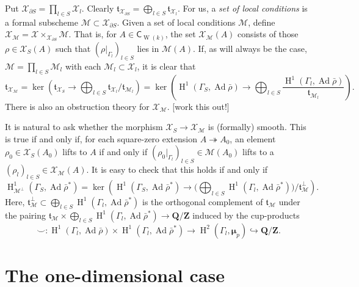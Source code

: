\documentclass{article}
\DeclareMathOperator{\adjoint}{Ad}
\DeclareMathOperator{\h}{H}
\DeclareMathOperator{\witt}{W}
\newcommand{\cM}{\mathcal{M}}
\newcommand{\cX}{\mathcal{X}}
\newcommand{\dmu}{\bm\mu}
\newcommand{\dQ}{\mathbf{Q}}
\newcommand{\dZ}{\mathbf{Z}}
\newcommand{\ft}{\mathfrak{t}}
\newcommand{\coefficient}{\mathsf{C}}
\newcommand{\epic}{\twoheadrightarrow}
\newcommand{\monic}{\hookrightarrow}
\begin{document}
Put $\cX_{\partial S}=\prod_{l\in S} \cX_l$. Clearly 
$\ft_{\cX_{\partial S}} = \bigoplus_{l\in S} \ft_{\cX_l}$. For us, a 
\emph{set of local conditions} is a formal subscheme 
$\cM\subset \cX_{\partial S}$. Given a set of local conditions $\cM$, 
define $\cX_\cM=\cX\times_{\cX_{\partial S}} \cM$. That is, for 
$A\in\coefficient_{\witt(k)}$, the set $\cX_\cM(A)$ consists of those 
$\rho\in\cX_S(A)$ such that $(\rho|_{\Gamma_l})_{l\in S}$ lies in 
$\cM(A)$. If, as will always be the case, $\cM=\prod_{l\in S}\cM_l$ with each 
$\cM_l\subset \cX_l$, it is clear that 
\[
  \ft_{\cX_\cM} = \ker\left(\ft_{\cX_S}\to \bigoplus_{l\in S} \ft_{\cX_l}/\ft_{\cM_l}\right) = \ker\left(\h^1(\Gamma_S,\adjoint\bar\rho) \to \bigoplus_{l\in S} \frac{\h^1(\Gamma_l,\adjoint\bar\rho)}{\ft_{\cM_l}}\right) .
\]
There is also an obstruction theory for $\cX_\cM$. [work this out!]

It is natural to ask whether the morphism $\cX_S\to \cX_\cM$ is (formally) 
smooth. This is true if and only if, for each square-zero extension 
$A\epic A_0$, an element $\rho_0\in \cX_S(A_0)$ lifts to $A$ if and only if 
$(\rho_0|_{\Gamma_l})_{l\in S}\in \cM(A_0)$ lifts to a 
$(\rho_l)_{l\in S}\in \cX_\cM(A)$. It is easy to check that this holds if and 
only if 
\[
  \h^1_{\cM^\bot}(\Gamma_S,\adjoint\bar\rho^\ast) = \ker\left(\h^1(\Gamma_S,\adjoint\bar\rho^\ast) \to \bigg(\bigoplus_{l\in S} \h^1(\Gamma_l,\adjoint\bar\rho^\ast)\bigg) / \ft_\cM^\bot\right) .
\]
Here, $\ft_\cM^\bot\subset \bigoplus_{l\in S} \h^1(\Gamma_l,\adjoint\bar\rho^\ast)$ 
is the orthogonal complement of $\ft_\cM$ under the pairing 
$\ft_\cM\times \bigoplus_{l\in S} \h^1(\Gamma_l,\adjoint\bar\rho^\ast)\to \dQ/\dZ$ 
induced by the cup-products 
\[
  \smallsmile:\h^1(\Gamma_l,\adjoint\bar\rho)\times \h^1(\Gamma_l,\adjoint\bar\rho^\ast)\to \h^2(\Gamma_l,\dmu_p) \monic \dQ/\dZ .
\]





\section{The one-dimensional case}
\end{document}
